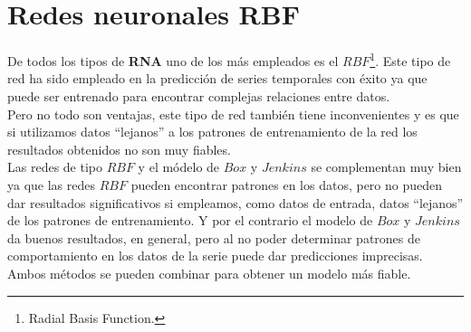 %
%

\section{Redes neuronales RBF}

De todos los tipos de \textbf{RNA} uno de los m\'as empleados es el
$RBF$\footnote{Radial Basis Function.}. Este tipo de red ha sido empleado en
la predicci\'on de series temporales con \'exito ya que puede ser entrenado para
encontrar complejas relaciones entre datos.\\

Pero no todo son ventajas, este tipo
de red tambi\'en tiene inconvenientes y es que si utilizamos datos ``lejanos'' a
los patrones de entrenamiento de la red los resultados obtenidos no son muy
fiables.\\

Las redes de tipo $RBF$ y el m\'odelo de $Box$ y $Jenkins$ se complementan muy
bien ya que las redes $RBF$ pueden encontrar patrones en los datos, pero no
pueden dar resultados significativos si empleamos, como datos de entrada, datos
``lejanos'' de los patrones de entrenamiento. Y por el contrario el modelo de
$Box$ y $Jenkins$ da buenos resultados, en general, pero al no poder determinar
patrones de comportamiento en los datos de la serie puede dar predicciones
imprecisas.\\

Ambos m\'etodos se pueden combinar para obtener un modelo m\'as fiable.
